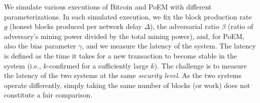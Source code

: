 %
%
%

We simulate various executions of Bitcoin and PoEM with different parameterizations.
In each simulated execution, we fix the block production rate $g$ (honest blocks produced per network delay $\Delta$),
the adversarial ratio $\beta$ (ratio of adversary's mining power divided by the total mining power),
and, for PoEM, also the bias parameter $\gamma$, and we
measure the latency of the system. The latency is defined as the time it takes for a new transaction
to become stable in the system (i.e., $k$-confirmed for a sufficiently large $k$).
The challenge is to measure the latency of the two
systems at the same \emph{security level}. As the two systems operate differently, simply
taking the same number of blocks (or work) does not constitute a fair comparison.

